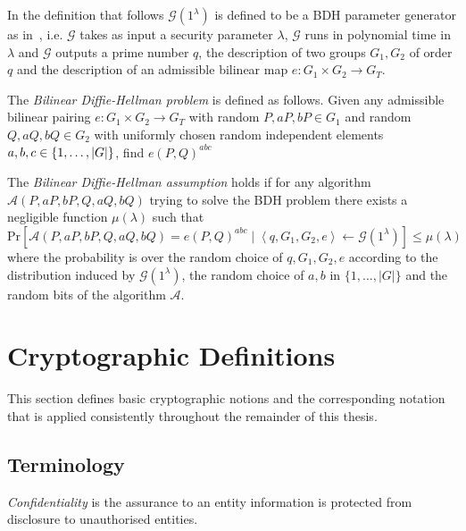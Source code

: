 In the definition that follows $\mathcal{G} \left( 1^{\lambda} \right)$ is defined to be a BDH parameter generator as in~\cite{art:BonehF01}, i.e. $\mathcal{G}$ takes as input a security parameter $\lambda$, $\mathcal{G}$ runs in polynomial time in $\lambda$ and $\mathcal{G}$ outputs a prime number $q$, the description of two groups $G_1, G_2$ of order $q$ and the description of an admissible bilinear map $e: G_1 \times G_2 \rightarrow G_T$.
\bigskip
\begin{defn}[BDH]
\label{def:bdh}
The \textit{Bilinear Diffie-Hellman problem} is defined as follows. Given any admissible bilinear pairing $e: G_1 \times G_2 \rightarrow G_T$ with random $P, aP, bP \in G_1$ and random $Q, aQ, bQ \in G_2$ with uniformly chosen random independent elements $a, b, c \medskip \in \{ 1, \ldots, | G |\}$, find $e \left( P, Q \right)^{abc}$

The \textit{Bilinear Diffie-Hellman assumption} holds if for any algorithm \\ $\mathcal{A} \left( P, aP, bP, Q, aQ, bQ \right)$ trying to solve the BDH problem there exists a negligible function $\mu \left( \lambda \right)$ such that 
 \begin{equation*}
  \textrm{Pr} \left[ \mathcal{A} \left( P, aP, bP, Q, aQ, bQ \right) = e \left( P, Q \right)^{abc} \mid \left< q, G_1, G_2, e \right> \leftarrow \mathcal{G} \left( 1^{\lambda} \right)\right] \leq \mu \left( \lambda \right)
 \end{equation*}
 where the probability is over the random choice of $q, G_1, G_2, e$ according to the distribution induced by $\mathcal{G} \left( 1^{\lambda} \right)$, the random choice of $a, b$ in $\{ 1, \ldots, | G |\}$ and the random bits of the algorithm $\mathcal{A}$.
\end{defn}
\section{Cryptographic Definitions}
This section defines basic cryptographic notions and the corresponding notation that is applied consistently throughout the remainder of this thesis.

\subsection{Terminology}

\begin{defn}[Confidentiality]
\label{def:confidentiality}
 \textit{Confidentiality} is the assurance to an entity information is protected from disclosure to unauthorised entities.
\end{defn}

